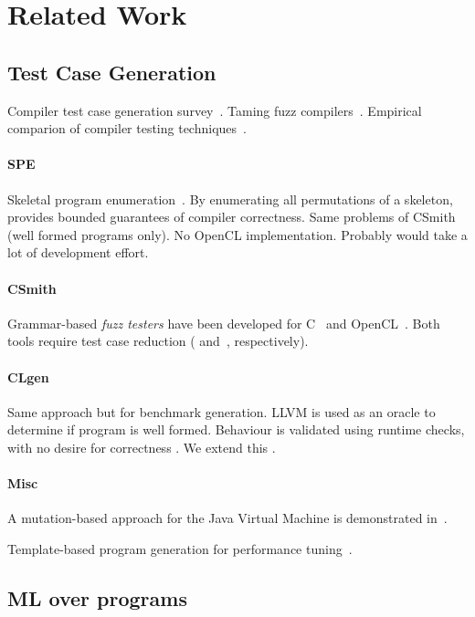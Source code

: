 \section{Related Work}\label{sec:rw}

\subsection{Test Case Generation}

 Compiler test case generation survey~\cite{Boujarwah1997}. Taming fuzz compilers~\cite{Chen2013}. Empirical comparion of compiler testing techniques~\cite{Chen2014a}.

\paragraph{SPE} Skeletal program enumeration~\cite{Zhang2016a}. By enumerating all permutations of a skeleton, provides bounded guarantees of compiler correctness. Same problems of CSmith (well formed programs only). No OpenCL implementation. Probably would take a lot of development effort. 

\paragraph{CSmith} Grammar-based \emph{fuzz testers} have been developed for C~\cite{Yang2011} and OpenCL~\cite{Lidbury2015a}. Both tools require test case reduction (\cite{Regehr2012a} and~\cite{Pflanzer2016}, respectively).

\paragraph{CLgen} Same approach but for benchmark generation. LLVM is used as an oracle to determine if program is well formed. Behaviour is validated using runtime checks, with no desire for correctness \cite{Cummins2017a}. We extend this \cec{\ldots}.

\paragraph{Misc} A mutation-based approach for the Java Virtual Machine is demonstrated in~\cite{Chena}.

Template-based program generation for performance tuning~\cite{Han2017}.

\subsection{ML over programs} 

